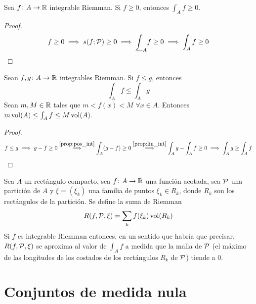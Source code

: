 \begin{prop}[Positividad]\label{prop:pos_int}
    Sea $f \colon A \to \mathbb{R}$ integrable Riemman. Si $f \geq 0$, entonces
    $\int_A f \geq 0$.
\end{prop}
\begin{proof}
    \[
        f \geq 0 \implies s(f;\mathcal{P}) \geq 0 \implies \underline{\int}_A f \geq 0
        \implies \int_A f \geq 0
    \]
\end{proof}

\begin{col}
    Sean $f,g \colon A \to \mathbb{R}$ integrables Riemman. Si $f \leq g$, entonces
    \[
        \int_A f \leq \int_A g
    \]
    Sean $m,M \in \mathbb{R}$ tales que $m < f(x) < M$ $\forall x \in A$. Entonces
    $m\operatorname{vol}(A) \leq \int_A f \leq M\operatorname{vol}(A)$.
\end{col}

\begin{proof}
    \[
        f \leq g \implies g - f \geq 0 \stackrel{\ref{prop:pos_int}}{\implies}
        \int_A (g-f) \geq 0 \stackrel{\ref{prop:lin_int}}{\implies} \int_A g -
        \int_A f \geq 0 \implies \int_A g \geq \int_A f
    \]
\end{proof}

\begin{prop}
    Sea $A$ un rectángulo compacto, sea $f \colon A \to \mathbb{R}$ una función acotada,
    sea $\mathcal{P}$ una partición de $A$ y $\xi = \left(\xi_k\right)$ una familia de
    puntos $\xi_k \in R_k$, donde $R_k$ son los rectángulos de la partición. Se
    define la suma de Riemman
    \[
        R(f,\mathcal{P},\xi) = \sum_k f(\xi_k)\operatorname{vol}(R_k)
    \]
    Si $f$ es integrable Riemman entonces, en un sentido que habría que precisar,
    $R(f,\mathcal{P},\xi)$ se aproxima al valor de $\int_A f$ a medida que la malla de
    $\mathcal{P}$ (el máximo de las longitudes de los costados de los rectángulos $R_k$ de
    $\mathcal{P}$) tiende a 0.
\end{prop}

\section{Conjuntos de medida nula}

